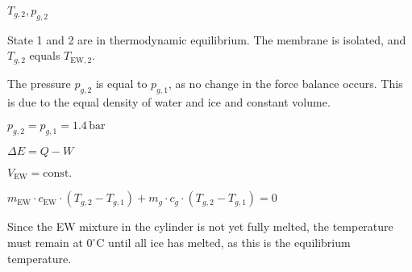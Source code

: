 \( T_{g,2}, p_{g,2} \)  

State 1 and 2 are in thermodynamic equilibrium. The membrane is isolated, and \( T_{g,2} \) equals \( T_{\text{EW},2} \).  

The pressure \( p_{g,2} \) is equal to \( p_{g,1} \), as no change in the force balance occurs. This is due to the equal density of water and ice and constant volume.  

\( p_{g,2} = p_{g,1} = 1.4 \, \text{bar} \)  

\( \Delta E = Q - W \)  

\( V_{\text{EW}} = \text{const.} \)  

\( m_{\text{EW}} \cdot c_{\text{EW}} \cdot (T_{g,2} - T_{g,1}) + m_g \cdot c_g \cdot (T_{g,2} - T_{g,1}) = 0 \)  

Since the EW mixture in the cylinder is not yet fully melted, the temperature must remain at \( 0^\circ \text{C} \) until all ice has melted, as this is the equilibrium temperature.